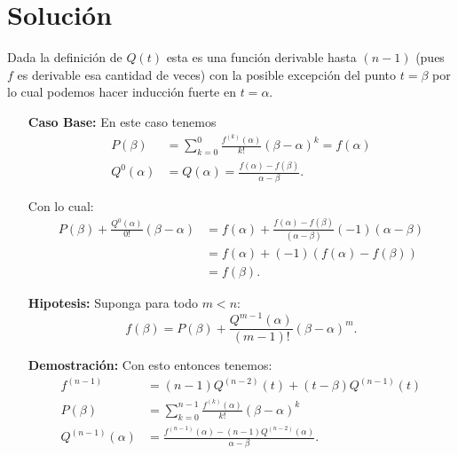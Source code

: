 \documentclass{report}
\begin{document}
\section{Solución}
Dada la definición de $Q\left( t \right) $ esta es una función derivable hasta $\left( n - 1 \right) $ (pues $f$ es derivable esa cantidad de veces) con la posible excepción del punto $t = \beta$ por lo cual podemos hacer inducción fuerte en $t = \alpha$.

\begin{itemize}
  \item[\textbf{Caso Base:}] En este caso tenemos
    \begin{align*}
      P\left( \beta \right) &= \sum_{k=0}^{0} \frac{f^{\left( k \right) }\left( \alpha \right) }{k!}\left( \beta - \alpha \right)^{k} = f\left( \alpha \right) \\
      Q^{0}\left( \alpha \right) &=  Q\left( \alpha \right) = \frac{f\left( \alpha \right) - f\left( \beta \right) }{\alpha - \beta}
    .\end{align*}

    Con lo cual:
    \begin{align*}
	P\left( \beta \right) + \frac{Q^{0}\left( \alpha \right) }{0!}\left( \beta - \alpha \right) &=  f\left( \alpha \right) + \frac{f\left( \alpha \right) - f\left( \beta \right) }{(\alpha - \beta)}\left( -1 \right) \left( \alpha - \beta \right)  \\
       &= f\left( \alpha \right) + \left( -1 \right) \left( f\left( \alpha \right) - f\left( \beta \right)  \right)   \\
      &= f\left( \beta \right) 
    .\end{align*}
  \item[\textbf{Hipotesis:}] Suponga para todo $m < n$:  \[
  f\left( \beta \right) = P\left( \beta \right) + \frac{Q^{m - 1}\left( \alpha \right) }{\left( m - 1 \right) !}\left( \beta - \alpha \right)^{m}
  .\] 
\item[\textbf{Demostración:}] Con esto entonces tenemos: 
  \begin{align*}
    f^{\left( n - 1 \right) } &= \left( n - 1  \right) Q^{\left( n - 2 \right) }\left( t \right) + \left( t - \beta \right) Q^{\left( n - 1 \right) }\left( t \right)  \\
    P\left( \beta \right) &= \sum_{k = 0}^{n - 1} \frac{f^{\left( k \right) }\left( \alpha \right) }{k!}\left( \beta - \alpha \right)^{k} \\
    Q^{\left( n - 1 \right) }\left( \alpha \right)  &= \frac{f^{\left( n - 1 \right) }\left( \alpha \right) - \left( n - 1 \right) Q^{\left( n - 2 \right) }\left( \alpha \right) }{\alpha - \beta}
  .\end{align*}


\end{itemize}
\end{document}
